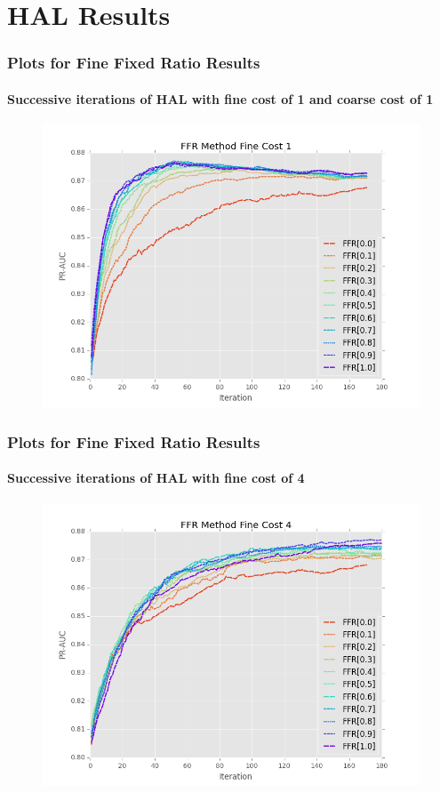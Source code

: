 \documentclass{beamer}
\begin{document}
\section{HAL Results}
\begin{frame}
    \frametitle{Plots for Fine Fixed Ratio Results}  %
    \framesubtitle{Successive iterations of HAL with fine cost of 1 and coarse cost of 1}
    \begin{figure}[!htb]
	\centering
    \includegraphics[width=0.8\columnwidth]{fig/ParamsFFR_PR_Cost1_rnds0_180}
\end{figure}
\end{frame}
\begin{frame}
    \frametitle{Plots for Fine Fixed Ratio Results}  %
    \framesubtitle{Successive iterations of HAL with fine cost of 4}
    \begin{figure}[!htb]
        \centering
        \includegraphics[width=0.8\columnwidth]{fig/ParamsFFR_PR_Cost4_rnds0_180}
        \label{fig:ParamsFFR_PR_Cost4_rnds0_180}
    \end{figure}
\end{frame}
\end{document}
